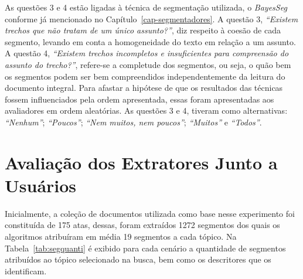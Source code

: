 		As questões 3 e 4 estão ligadas à técnica de segmentação utilizada, o \textit{BayesSeg} conforme já mencionado no Capítulo~\ref{cap-segmentadores}. 
A questão 3, \textit{``Existem trechos que não tratam de um único assunto?''}, diz respeito à coesão de cada segmento, levando em conta a homogeneidade do texto em relação a um assunto. A questão 4, \textit{``Existem trechos incompletos e insuficientes para compreensão do assunto do trecho?''}, refere-se a completude dos segmentos, ou seja, o quão bem os segmentos podem ser bem compreendidos independentemente da leitura do documento integral.
Para afastar a hipótese de que os resultados das técnicas fossem influenciados pela ordem apresentada, essas foram apresentadas aos avaliadores em ordem aleatórias.
% 
As questões 3 e 4, tiveram como alternativas: 
		\textit{``Nenhum''};
		\textit{``Poucos''};
		\textit{``Nem muitos, nem poucos''};
		\textit{``Muitos''} e 
		\textit{``Todos''}.








\section{Avaliação dos Extratores Junto a Usuários}

Inicialmente, a coleção de documentos utilizada como base nesse experimento foi constituída de 175 atas, dessas, foram extraídos 1272 segmentos dos quais os algoritmos atribuíram em média 19 segmentos a cada tópico. Na Tabela~\ref{tab:segquanti} é exibido para cada cenário a quantidade de segmentos atribuídos ao tópico selecionado na busca, bem como os descritores que os identificam.
 
